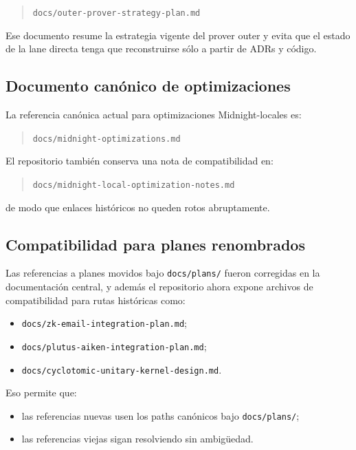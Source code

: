 \documentclass[11pt,a4paper]{article}
\begin{document}
\begin{quote}
\texttt{docs/outer-prover-strategy-plan.md}
\end{quote}

Ese documento resume la estrategia vigente del prover outer y evita que el
estado de la lane directa tenga que reconstruirse s\'olo a partir de ADRs y
c\'odigo.

\subsection{Documento can\'onico de optimizaciones}

La referencia can\'onica actual para optimizaciones Midnight-locales es:

\begin{quote}
\texttt{docs/midnight-optimizations.md}
\end{quote}

El repositorio tambi\'en conserva una nota de compatibilidad en:

\begin{quote}
\texttt{docs/midnight-local-optimization-notes.md}
\end{quote}

de modo que enlaces hist\'oricos no queden rotos abruptamente.

\subsection{Compatibilidad para planes renombrados}

Las referencias a planes movidos bajo \texttt{docs/plans/} fueron corregidas en
la documentaci\'on central, y adem\'as el repositorio ahora expone archivos de
compatibilidad para rutas hist\'oricas como:

\begin{itemize}
  \item \texttt{docs/zk-email-integration-plan.md};
  \item \texttt{docs/plutus-aiken-integration-plan.md};
  \item \texttt{docs/cyclotomic-unitary-kernel-design.md}.
\end{itemize}

Eso permite que:

\begin{itemize}
  \item las referencias nuevas usen los paths can\'onicos bajo \texttt{docs/plans/};
  \item las referencias viejas sigan resolviendo sin ambig\"uedad.
\end{itemize}
\end{document}
